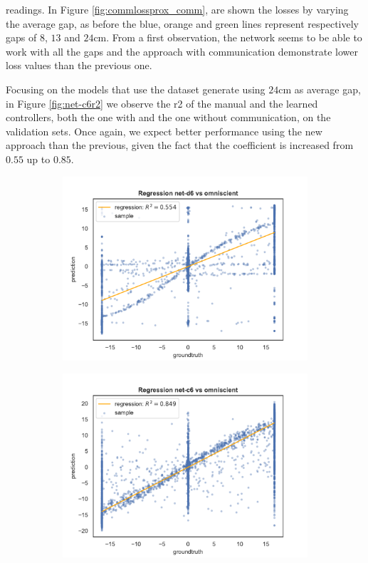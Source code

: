 \noindent
 readings. In Figure \ref{fig:commlossprox_comm}, are 
shown the losses by varying the average gap, as before the blue, orange and 
green lines represent respectively gaps of $8$, $13$ and $24$\gls{cm}. From a 
first observation, the network seems to be able to work with all the gaps and the  
approach with communication demonstrate lower loss values than the previous 
one.

Focusing on the models that use the dataset generate using $24$\gls{cm} as 
average gap, in Figure \ref{fig:net-c6r2} we observe the \gls{r2} of the manual 
and the learned controllers, both the one with and the one without 
communication, on the validation sets.
Once again, we expect better performance using the new approach than the 
previous, given the fact that the coefficient is increased from $0.55$ up to $0.85$.
\begin{figure}[!htb]
	\begin{center}
		\begin{subfigure}[h]{0.49\textwidth}
			\includegraphics[width=\textwidth]{contents/images/net-d6/regression-net-d6-vs-omniscient}%
		\end{subfigure}
		\hfill\vspace{-0.5cm}
		\begin{subfigure}[h]{0.49\textwidth}
			\includegraphics[width=\textwidth]{contents/images/net-c6/regression-net-c6-vs-omniscient}%

\end{subfigure}
\end{center}
\end{figure}
